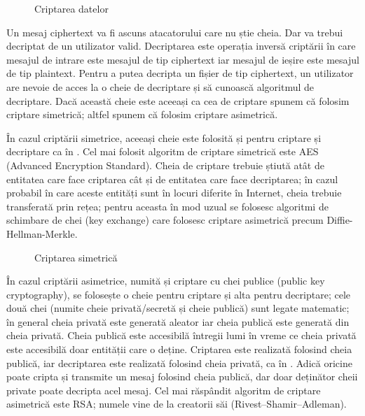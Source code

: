 \begin{figure}[htbp]
  \centering
  \def\svgwidth{\columnwidth}
  
  \caption{Criptarea datelor}
  \label{fig:sec:encryption}
\end{figure}

Un mesaj ciphertext va fi ascuns atacatorului care nu știe cheia. Dar va trebui decriptat de un utilizator valid. Decriptarea este operația inversă criptării în care mesajul de intrare este mesajul de tip ciphertext iar mesajul de ieșire este mesajul de tip plaintext. Pentru a putea decripta un fișier de tip ciphertext, un utilizator are nevoie de acces la o cheie de decriptare și să cunoască algoritmul de decriptare. Dacă această cheie este aceeași ca cea de criptare spunem că folosim criptare simetrică; altfel spunem că folosim criptare asimetrică.

În cazul criptării simetrice, aceeași cheie este folosită și pentru criptare și decriptare ca în . Cel mai folosit algoritm de criptare simetrică este AES (Advanced Encryption Standard). Cheia de criptare trebuie știută atât de entitatea care face criptarea cât și de entitatea care face decriptarea; în cazul probabil în care aceste entități sunt în locuri diferite în Internet, cheia trebuie transferată prin rețea; pentru aceasta în mod uzual se folosesc algoritmi de schimbare de chei (key exchange) care folosesc criptare asimetrică precum Diffie-Hellman-Merkle.

\begin{figure}[htbp]
  \centering
  \def\svgwidth{\columnwidth}
  
  \caption{Criptarea simetrică}
  \label{fig:sec:symmetric-encryption}
\end{figure}

În cazul criptării asimetrice, numită și criptare cu chei publice (public key cryptography), se folosește o cheie pentru criptare și alta pentru decriptare; cele două chei (numite cheie privată/secretă și cheie publică) sunt legate matematic; în general cheia privată este generată aleator iar cheia publică este generată din cheia privată. Cheia publică este accesibilă întregii lumi în vreme ce cheia privată este accesibilă doar entității care o deține. Criptarea este realizată folosind cheia publică, iar decriptarea este realizată folosind cheia privată, ca în . Adică oricine poate cripta și transmite un mesaj folosind cheia publică, dar doar deținător cheii private poate decripta acel mesaj. Cel mai răspândit algoritm de criptare asimetrică este RSA; numele vine de la creatorii săi (Rivest–Shamir–Adleman).

